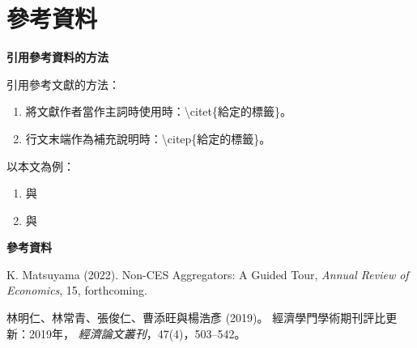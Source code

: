 \documentclass[12pt, aspectratio=169]{beamer}
\begin{document}

\section{參考資料}


\linespread{1} 
\begin{frame}{\textbf{引用參考資料的方法}}
\linespread{1.5}

	引用參考文獻的方法：
	
	\begin{enumerate}[1]
		\item 將文獻作者當作主詞時使用時：\textbackslash citet\{給定的標籤\}。
		\item 行文末端作為補充說明時：\textbackslash citep\{給定的標籤\}。
	\end{enumerate}
	
	\bigskip
	
	以本文為例：
	
	\begin{enumerate}[1]
		\item \citet{Non-CES} 與 \citet{期刊評比}
		\item \citep{Non-CES} 與 \citep{期刊評比}
	\end{enumerate}
	
\end{frame}


\linespread{1} 
\begin{frame}{\textbf{參考資料}}
\linespread{1.5} 

\footnotesize

\begin{thebibliography}{99} 

		K. Matsuyama (2022). %
		\newblock Non-CES Aggregators: A Guided Tour, %
		\newblock \emph{Annual Review of Economics}, 15, forthcoming. %

		林明仁、林常青、張俊仁、曹添旺與楊浩彥 (2019)。 
		\newblock 經濟學門學術期刊評比更新：2019年，
		\newblock \emph{經濟論文叢刊}，47(4)，503--542。
		
\end{thebibliography}

\end{frame}
\end{document}
